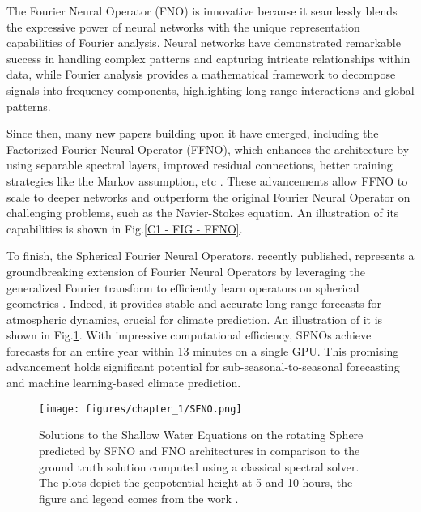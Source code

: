 \vspace{-0.3em}

The Fourier Neural Operator (FNO) is innovative because it seamlessly blends the expressive power of neural networks with the unique representation capabilities of Fourier analysis. Neural networks have demonstrated remarkable success in handling complex patterns and capturing intricate relationships within data, while Fourier analysis provides a mathematical framework to decompose signals into frequency components, highlighting long-range interactions and global patterns.\\

\vspace{-0.3em}

Since then, many new papers building upon it have emerged, including the Factorized Fourier Neural Operator (FFNO), which enhances the architecture by using separable spectral layers, improved residual connections, better training strategies like the Markov assumption, etc \citep{FFNO}. These advancements allow FFNO to scale to deeper networks and outperform the original Fourier Neural Operator on challenging problems, such as the Navier-Stokes equation. An illustration of its capabilities is shown in Fig.\ref{C1 - FIG - FFNO}.\\

\vspace{-0.3em}

To finish, the Spherical Fourier Neural Operators, recently published,  represents a groundbreaking extension of Fourier Neural Operators by leveraging the generalized Fourier transform to efficiently learn operators on spherical geometries \citep{SFNO}. Indeed, it provides stable and accurate long-range forecasts for atmospheric dynamics, crucial for climate prediction. An illustration of it is shown in Fig.\ref{C1 - FIG - SFNO}. With impressive computational efficiency, SFNOs achieve forecasts for an entire year within 13 minutes on a single GPU. This promising advancement holds significant potential for sub-seasonal-to-seasonal forecasting and machine learning-based climate prediction.

\begin{figure}[!b]
    \centering
    \texttt{[image: figures/chapter\_1/SFNO.png]}
    \caption{Solutions to the Shallow Water Equations on the rotating Sphere predicted by SFNO and FNO architectures in comparison to the ground truth solution computed using a classical spectral solver.  The plots depict the geopotential height at 5 and 10 hours, the figure and legend comes from the work \cite{SFNO}.}
    \label{C1 - FIG - SFNO}
\end{figure}

